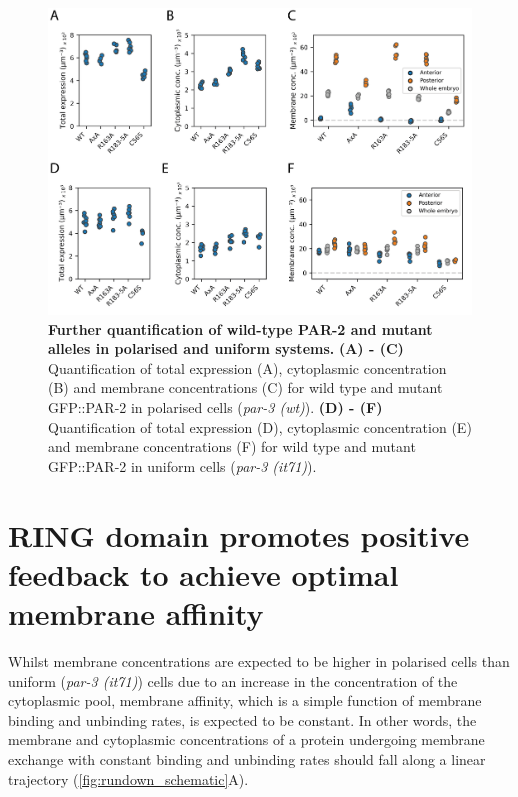 \documentclass[12pt]{"report"}
\newcommand{\mycaption}[2]{\caption[#1]{\textbf{#1.} #2}}
\begin{document}
\begin{figure}
\includegraphics[scale=0.9]{par2_misc_mutants_detailed_quantification}
\centering
\mycaption{Further quantification of wild-type PAR-2 and mutant alleles in polarised and uniform systems}{
\textbf{(A) - (C)} Quantification of total expression (A), cytoplasmic concentration (B) and membrane concentrations (C) for wild type and mutant GFP::PAR-2 in polarised cells (\textit{par-3 (wt)}). 
\textbf{(D) - (F)} Quantification of total expression (D), cytoplasmic concentration (E) and membrane concentrations (F) for wild type and mutant GFP::PAR-2 in uniform cells (\textit{par-3 (it71)}). 
}
\label{fig:par2_misc_mutants_detailed_quantification}
\end{figure}




\section{RING domain promotes positive feedback to achieve optimal membrane affinity}

Whilst membrane concentrations are expected to be higher in polarised cells than uniform (\textit{par-3 (it71)}) cells due to an increase in the concentration of the cytoplasmic pool, membrane affinity, which is a simple function of membrane binding and unbinding rates, is expected to be constant. In other words, the membrane and cytoplasmic concentrations of a protein undergoing membrane exchange with constant binding and unbinding rates should fall along a linear trajectory (\cref{fig:rundown_schematic}A).\\
\end{document}
